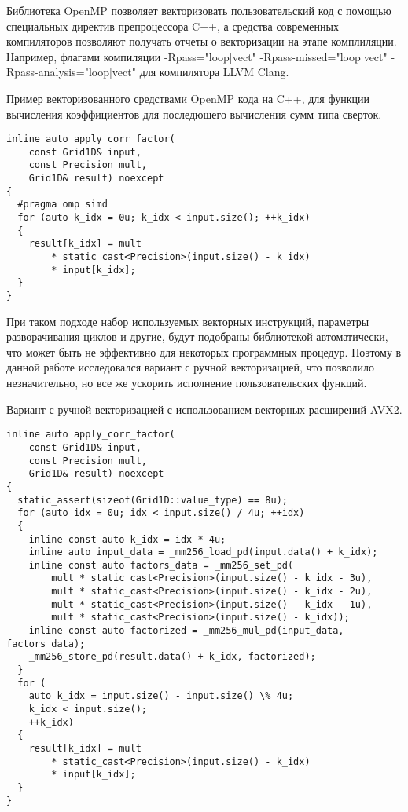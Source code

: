 Библиотека OpenMP позволяет векторизовать пользовательский код с помощью специальных директив препроцессора C++, а средства
современных компиляторов позволяют получать отчеты о векторизации на этапе комплиляции.
Например, флагами компиляции -Rpass="loop|vect" -Rpass-missed="loop|vect" -Rpass-analysis="loop|vect" для компилятора LLVM Clang.

Пример векторизованного средствами OpenMP кода на C++, для функции вычисления коэффициентов для последющего вычисления сумм типа сверток.

\begin{lstlisting}
inline auto apply_corr_factor(
	const Grid1D& input,
	const Precision mult,
	Grid1D& result) noexcept
{
  #pragma omp simd
  for (auto k_idx = 0u; k_idx < input.size(); ++k_idx)
  {
    result[k_idx] = mult 
    	* static_cast<Precision>(input.size() - k_idx)
    	* input[k_idx];
  }
}
\end{lstlisting}

При таком подходе набор используемых векторных инструкций, параметры разворачивания циклов и другие, будут подобраны библиотекой автоматически,
что может быть не эффективно для некоторых программных процедур. Поэтому в данной работе исследовался вариант с ручной векторизацией,
что позволило незначительно, но все же ускорить исполнение пользовательских функций.

Вариант с ручной векторизацией с использованием векторных расширений AVX2.

\begin{lstlisting}
inline auto apply_corr_factor(
	const Grid1D& input,
	const Precision mult,
	Grid1D& result) noexcept
{
  static_assert(sizeof(Grid1D::value_type) == 8u);
  for (auto idx = 0u; idx < input.size() / 4u; ++idx)
  {
    inline const auto k_idx = idx * 4u;
    inline auto input_data = _mm256_load_pd(input.data() + k_idx);
    inline const auto factors_data = _mm256_set_pd(
        mult * static_cast<Precision>(input.size() - k_idx - 3u),
        mult * static_cast<Precision>(input.size() - k_idx - 2u),
        mult * static_cast<Precision>(input.size() - k_idx - 1u),
        mult * static_cast<Precision>(input.size() - k_idx));
    inline const auto factorized = _mm256_mul_pd(input_data, factors_data);
    _mm256_store_pd(result.data() + k_idx, factorized);
  }
  for (
  	auto k_idx = input.size() - input.size() \% 4u;
  	k_idx < input.size();
  	++k_idx) 
  {
    result[k_idx] = mult
    	* static_cast<Precision>(input.size() - k_idx)
    	* input[k_idx];
  }
}
\end{lstlisting}

